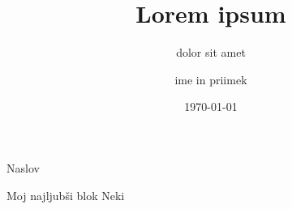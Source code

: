 \documentclass{beamer}
\title[kratek]{Lorem ipsum}
\subtitle[kratek]{dolor sit amet}
\author[kratko]{ime in priimek}
\date[kratko]{\today}
\begin{document}
\frame{\titlepage}

\frame{\tableofcontents}

\begin{frame}{Naslov}
  \begin{block}{Moj najljubši blok}
    Neki
  \end{block}
\end{frame}
\end{document}
